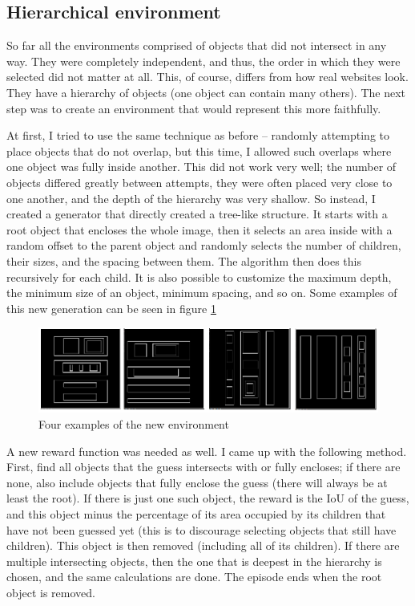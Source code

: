 \documentclass[
  digital,     %
  oneside,     %
  nosansbold,  %
  nocolorbold, %
  lof,         %
  lot,         %
]{fithesis4}
\begin{document}
\subsection{Hierarchical environment}

So far all the environments comprised of objects that did not intersect in any way. They were completely independent, and thus, the order in which they were selected did not matter at all. This, of course, differs from how real websites look. They have a hierarchy of objects (one object can contain many others). The next step was to create an environment that would represent this more faithfully.

At first, I tried to use the same technique as before -- randomly attempting to place objects that do not overlap, but this time, I allowed such overlaps where one object was fully inside another. This did not work very well; the number of objects differed greatly between attempts, they were often placed very close to one another, and the depth of the hierarchy was very shallow. So instead, I created a generator that directly created a tree-like structure. It starts with a root object that encloses the whole image, then it selects an area inside with a random offset to the parent object and randomly selects the number of children, their sizes, and the spacing between them. The algorithm then does this recursively for each child. It is also possible to customize the maximum depth, the minimum size of an object, minimum spacing, and so on. Some examples of this new generation can be seen in figure \ref{fig:env7}

\begin{figure}
    \centering
    \includegraphics[width=1\linewidth]{env_examples/env7.png}
    \caption{Four examples of the new environment}
    \label{fig:env7}
\end{figure}

A new reward function was needed as well. I came up with the following method. First, find all objects that the guess intersects with or fully encloses; if there are none, also include objects that fully enclose the guess (there will always be at least the root). If there is just one such object, the reward is the IoU of the guess, and this object minus the percentage of its area occupied by its children that have not been guessed yet (this is to discourage selecting objects that still have children). This object is then removed (including all of its children). If there are multiple intersecting objects, then the one that is deepest in the hierarchy is chosen, and the same calculations are done. The episode ends when the root object is removed.
\end{document}
